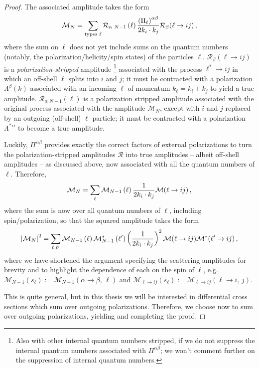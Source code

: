 \begin{proof}
The associated amplitude takes the form
\begin{align}
    \mathcal{M}_N
    =
    \sum_{\text{types }\ell}
    \mathcal{R}_{\alpha\,\,N-1}\left(\ell\right)
    \frac{\left(\Pi_\ell\right)^{\alpha\beta}}{2 k_i \cdot k_j}
    \mathcal{R}_\beta(\ell \to i j)
    \,,
\end{align}
where the sum on \(\ell\) does not yet include sums on the quantum numbers (notably, the polarization/helicity/spin states) of the particles \(\ell\).
%
\(\mathcal{R}_\beta(\ell \to i j)\) is a \textit{polarization-stripped} amplitude%
\footnote{
    Also with other internal quantum numbers stripped, if we do not suppress the internal quantum numbers associated with \(\Pi^{\alpha\beta}\);
    we won't comment further on the suppression of internal quantum numbers.
}
associated with the process \(\ell^* \to i j\) in which an off-shell \(\ell\) splits into \(i\) and \(j\);
%
it must be contracted with a polarization \(\Lambda^\beta(k)\) associated with an incoming \(\ell\) of momentum \(k_\ell = k_i + k_j\) to yield a true amplitude.
%
\(\mathcal{R}_{\alpha\,\,N-1}(\ell)\) is a polarization stripped amplitude associated with the original process associated with the amplitude \(\mathcal{M}_N\), except with \(i\) and \(j\) replaced by an outgoing (off-shell) \(\ell\) particle;
%
it must be contracted with a polarization \(\Lambda^{*\,\alpha}\) to become a true amplitude.

Luckily, \(\Pi^{\alpha\beta}\) provides exactly the correct factors of external polarizations to turn the polarization-stripped amplitudes \(\mathcal{R}\) into true amplitudes -- albeit off-shell amplitudes -- as discussed above, now associated with all the quantum numbers of \(\ell\).
%
Therefore,
\begin{align}
    \label{eq:amplitude-factorization}
    \mathcal{M}_N
    =
    \sum_\ell
    \mathcal{M}_{N-1}\le(\ell\ri)
    \frac{1}{2 k_i \cdot k_j}
    \mathcal{M}(\ell \to i j)
    \,,
\end{align}
where the sum is now over all quantum numbers of \(\ell\), including spin/polarization, so that the squared amplitude takes the form
\begin{align}
    \label{eq:squared-amplitude-factorized}
    \abs{\mathcal{M}_N}^2
    =
    \sum_{\ell, \ell'}
    \mathcal{M}_{N-1}\le(\ell\ri)
    \mathcal{M}^*_{N-1}\le(\ell'\ri)
    \le(\frac{1}{2 k_i \cdot k_j}\ri)^2
    \mathcal{M}(\ell \to ij)
    \mathcal{M}^*(\ell' \to ij)
    \,,
\end{align}
where we have shortened the argument specifying the scattering amplitudes for brevity and to highlight the dependence of each on the spin of \(\ell\), e.g. \(\mathcal{M}_{N-1}(s_\ell) := \mathcal{M}_{N-1}(\alpha \to \beta,\,\ell)\) and \(\mathcal{M}_{\ell \to i j}(s_\ell) := \mathcal{M}_{\ell \to i j}(\ell \to i,\, j)\).

This is quite general, but in this thesis we will be interested in differential cross sections which sum over outgoing polarizations.
%
Therefore, we choose now to sum over outgoing polarizations, yielding  and completing the proof.
\end{proof}

